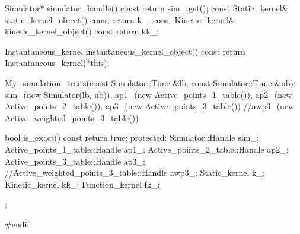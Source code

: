 \begin{ccExampleCode}
{  Simulator* simulator_handle() const { return sim_.get();}
  const Static_kernel& static_kernel_object() const {return k_;}
  const Kinetic_kernel& kinetic_kernel_object() const {return kk_;}
 
  Instantaneous_kernel instantaneous_kernel_object() const {
    return Instantaneous_kernel(*this);
  }

  My_simulation_traits(const Simulator::Time &lb,
			  const Simulator::Time &ub): sim_(new Simulator(lb, ub)),
						      ap1_(new Active_points_1_table()),
						      ap2_(new Active_points_2_table()),
						      ap3_(new Active_points_3_table())
						      //awp3_(new Active_weighted_points_3_table())
{}
 
  
  bool is_exact() const {
    return true;
  }
protected:
  Simulator::Handle sim_;
  Active_points_1_table::Handle ap1_;
  Active_points_2_table::Handle ap2_;
  Active_points_3_table::Handle ap3_;
  //Active_weighted_points_3_table::Handle awp3_;
  Static_kernel k_;
  Kinetic_kernel kk_;
  Function_kernel fk_;
};

#endif



\end{ccExampleCode}


